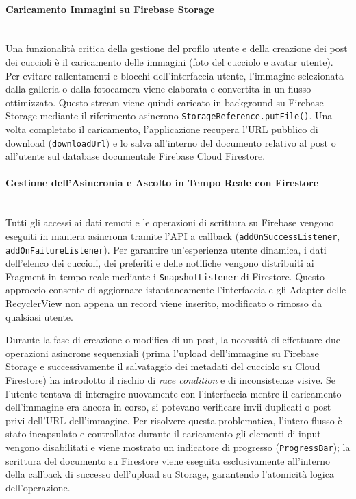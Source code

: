 \documentclass[a4paper]{report}
\begin{document}
\paragraph{Caricamento Immagini su Firebase Storage}
\vphantom{space} \\[0.5cm]
Una funzionalità critica della gestione del profilo utente e della creazione dei post dei cuccioli è il caricamento delle immagini (foto del cucciolo e avatar utente). Per evitare rallentamenti e blocchi dell'interfaccia utente, l'immagine selezionata dalla galleria o dalla fotocamera viene elaborata e convertita in un flusso ottimizzato. Questo stream viene quindi caricato in background su Firebase Storage mediante il riferimento asincrono \texttt{StorageReference.putFile()}. Una volta completato il caricamento, l'applicazione recupera l'URL pubblico di download (\texttt{downloadUrl}) e lo salva all'interno del documento relativo al post o all'utente sul database documentale Firebase Cloud Firestore.

\paragraph{Gestione dell'Asincronia e Ascolto in Tempo Reale con Firestore}
\vphantom{space} \\[0.5cm]
Tutti gli accessi ai dati remoti e le operazioni di scrittura su Firebase vengono eseguiti in maniera asincrona tramite l'API a callback (\texttt{addOnSuccessListener}, \texttt{addOnFailureListener}). Per garantire un'esperienza utente dinamica, i dati dell'elenco dei cuccioli, dei preferiti e delle notifiche vengono distribuiti ai Fragment in tempo reale mediante i \texttt{SnapshotListener} di Firestore. Questo approccio consente di aggiornare istantaneamente l'interfaccia e gli Adapter delle RecyclerView non appena un record viene inserito, modificato o rimosso da qualsiasi utente.


Durante la fase di creazione o modifica di un post, la necessità di effettuare due operazioni asincrone sequenziali (prima l'upload dell'immagine su Firebase Storage e successivamente il salvataggio dei metadati del cucciolo su Cloud Firestore) ha introdotto il rischio di \textit{race condition} e di inconsistenze visive. Se l'utente tentava di interagire nuovamente con l'interfaccia mentre il caricamento dell'immagine era ancora in corso, si potevano verificare invii duplicati o post privi dell'URL dell'immagine.
\noindent Per risolvere questa problematica, l'intero flusso è stato incapsulato e controllato: durante il caricamento gli elementi di input vengono disabilitati e viene mostrato un indicatore di progresso (\texttt{ProgressBar}); la scrittura del documento su Firestore viene eseguita esclusivamente all'interno della callback di successo dell'upload su Storage, garantendo l'atomicità logica dell'operazione.
\end{document}

